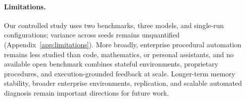 \paragraph{Limitations.}
Our controlled study uses two benchmarks, three models, and single-run
configurations; variance across seeds remains unquantified
(Appendix~\ref{app:limitations}). More broadly, enterprise procedural
automation remains less studied than code, mathematics, or personal assistants,
and no available open benchmark combines stateful environments, proprietary
procedures, and execution-grounded feedback at scale. Longer-term memory
stability, broader enterprise environments, replication, and scalable automated
diagnosis remain important directions for future work.
